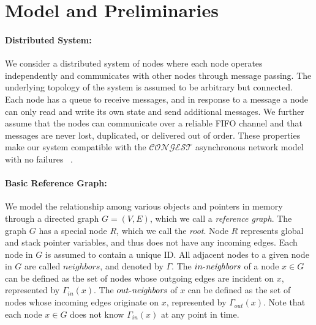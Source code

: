 
\section{Model and Preliminaries}
\label{model}
\paragraph{Distributed System:}
We consider a distributed system of nodes
where each node operates independently and communicates with other nodes through
message passing. The underlying topology of the system is assumed to be arbitrary but connected. Each node has a queue to receive messages, and in response to a message a node can only read and write its own state and send additional messages. %
We further assume that the nodes can communicate over
a reliable FIFO channel and that messages
are never lost, duplicated, or delivered out of order.
These properties make our system compatible with the $\mathcal{CONGEST}$ asynchronous network model with no failures ~\cite{congest}.

\paragraph{Basic Reference Graph:}
We model the relationship among various objects and pointers in memory through a directed graph $G = (V, E)$, which we call a {\it reference graph}.
The graph $G$ has a special node $R$, which we call the {\it root}. Node $R$
represents
global and stack pointer variables, and
thus does not have any incoming edges.
Each node in $G$ is assumed to contain a unique ID. %
All adjacent nodes to a given node in $G$ are called $neighbors$, and denoted by $\Gamma$. The
$\mathop{\mbox{$in$-$\mathit{neighbors}$}}$ of a node $x\in G$ can be defined as the set of nodes whose outgoing edges
are incident on $x$, represented by $\Gamma_{in}(x)$. The $\mathop{\mbox{$out$-$\mathit{neighbors}$}}$ of $x$ can be defined as the set
of nodes whose incoming edges originate on $x$, represented by $\Gamma_{out}(x)$.
Note that each node $x\in G$ does not know $\Gamma_{in}(x)$ at any point in time.

